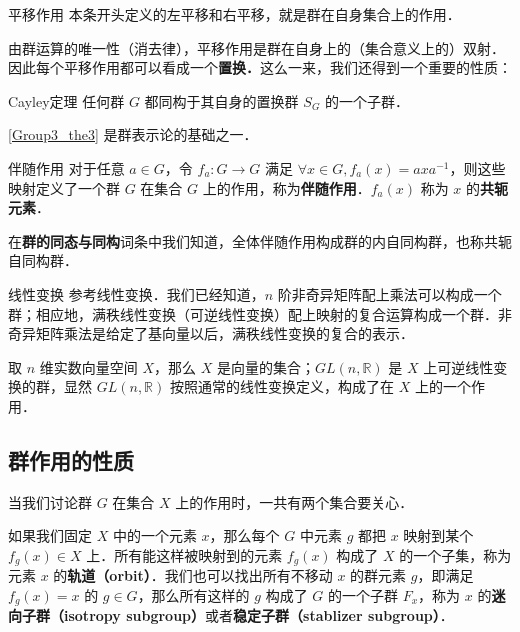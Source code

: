 \begin{example}{平移作用}\label{Group3_ex1}
本条开头定义的左平移和右平移，就是群在自身集合上的作用．
\end{example}

由群运算的唯一性（消去律），平移作用是群在自身上的（集合意义上的）双射．因此每个平移作用都可以看成一个\textbf{置换．}这么一来，我们还得到一个重要的性质：

\begin{theorem}{Cayley定理}\label{Group3_the3}
任何群 $G$ 都同构于其自身的置换群 $S_G$ 的一个子群．
\end{theorem}

\autoref{Group3_the3} 是群表示论的基础之一．

\begin{example}{伴随作用}\label{Group3_ex2}
对于任意 $a\in G$，令 $f_a: G\rightarrow G$ 满足 $\forall x\in G, f_a(x)=axa^{-1}$，则这些映射定义了一个群 $G$ 在集合 $G$ 上的作用，称为\textbf{伴随作用}．$f_a(x)$ 称为 $x$ 的\textbf{共轭元素}．

在\textbf{群的同态与同构}词条中我们知道，全体伴随作用构成群的内自同构群，也称共轭自同构群．
\end{example}

\begin{example}{线性变换}\label{Group3_ex3}
参考线性变换．我们已经知道，$n$ 阶非奇异矩阵配上乘法可以构成一个群；相应地，满秩线性变换（可逆线性变换）配上映射的复合运算构成一个群．非奇异矩阵乘法是给定了基向量以后，满秩线性变换的复合的表示．

取 $n$ 维实数向量空间 $X$，那么 $X$ 是向量的集合；$GL(n,\mathbb{R})$ 是 $X$ 上可逆线性变换的群，显然 $GL(n,\mathbb{R})$ 按照通常的线性变换定义，构成了在 $X$ 上的一个作用．
\end{example}

\subsection{群作用的性质}

当我们讨论群 $G$ 在集合 $X$ 上的作用时，一共有两个集合要关心．

如果我们固定 $X$ 中的一个元素 $x$，那么每个 $G$ 中元素 $g$ 都把 $x$ 映射到某个 $f_g(x)\in X$ 上．所有能这样被映射到的元素 $f_g(x)$ 构成了 $X$ 的一个子集，称为元素 $x$ 的\textbf{轨道（orbit）}．我们也可以找出所有不移动 $x$ 的群元素 $g$，即满足 $f_g(x)=x$ 的 $g\in G$，那么所有这样的 $g$ 构成了 $G$ 的一个子群 $F_x$，称为 $x$ 的\textbf{迷向子群（isotropy subgroup）}或者\textbf{稳定子群（stablizer subgroup）}．


